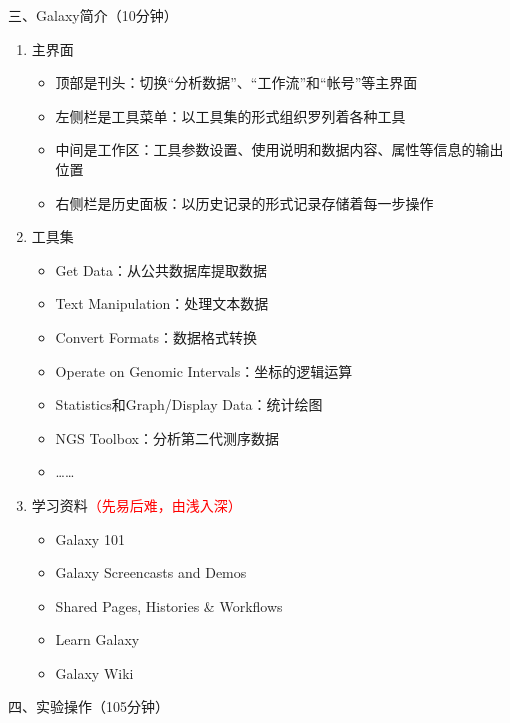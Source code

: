 \documentclass{TIJMUjiaoanSY}
\begin{document}
\vspace*{0.2cm}
\noindent
三、Galaxy简介（10分钟）
\begin{enumerate}
  \item 主界面
  \begin{itemize}
    \item 顶部是刊头：切换“分析数据”、“工作流”和“帐号”等主界面
    \item 左侧栏是工具菜单：以工具集的形式组织罗列着各种工具
    \item 中间是工作区：工具参数设置、使用说明和数据内容、属性等信息的输出位置
    \item 右侧栏是历史面板：以历史记录的形式记录存储着每一步操作
  \end{itemize}
  \item 工具集
  \begin{itemize}
    \item Get Data：从公共数据库提取数据
    \item Text Manipulation：处理文本数据
    \item Convert Formats：数据格式转换
    \item Operate on Genomic Intervals：坐标的逻辑运算
    \item Statistics和Graph/Display Data：统计绘图
    \item NGS Toolbox：分析第二代测序数据
    \item ……
  \end{itemize}
  \item 学习资料\textcolor{red}{（先易后难，由浅入深）}
  \begin{itemize}
    \item Galaxy 101
    \item Galaxy Screencasts and Demos
    \item Shared Pages, Histories \& Workflows
    \item Learn Galaxy
    \item Galaxy Wiki
  \end{itemize}
\end{enumerate}

\otherTail
\newpage
\otherHeader

\noindent
四、实验操作（105分钟）
\end{document}
